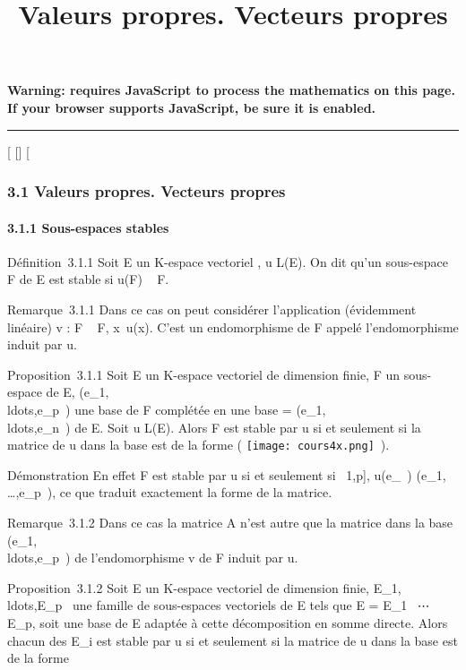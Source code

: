 \documentclass[]{article}
\title{Valeurs propres. Vecteurs propres}
\author{}
\date{}
\begin{document}
\maketitle

\textbf{Warning: 
requires JavaScript to process the mathematics on this page.\\ If your
browser supports JavaScript, be sure it is enabled.}

\begin{center}\rule{3in}{0.4pt}\end{center}

{[}
{[}{]}
{[}

\subsubsection{3.1 Valeurs propres. Vecteurs propres}

\paragraph{3.1.1 Sous-espaces stables}

Définition~3.1.1 Soit E un K-espace vectoriel , u \in L(E). On dit qu'un
sous-espace F de E est stable si u(F) \subset~ F.

Remarque~3.1.1 Dans ce cas on peut considérer l'application (évidemment
linéaire) v : F \rightarrow~ F, x\mapsto~u(x). C'est un
endomorphisme de F appelé l'endomorphisme induit par u.

Proposition~3.1.1 Soit E un K-espace vectoriel de dimension finie, F un
sous-espace de E,
(e\_1,\\ldots,e\_p~)
une base de F complétée en une base  =
(e\_1,\\ldots,e\_n~)
de E. Soit u \in L(E). Alors F est stable par u si et seulement si la
matrice de u dans la base  est de la forme \left (
\texttt{[image: cours4x.png]} \,\right ).

Démonstration En effet F est stable par u si et seulement si
\forall~\jmath \in {[}1,p{]}, u(e\_\jmath~)
\in\mathrmVect(e\_1,\\\ldots,e\_p~),
ce que traduit exactement la forme de la matrice.

Remarque~3.1.2 Dans ce cas la matrice A n'est autre que la matrice dans
la base
(e\_1,\\ldots,e\_p~)
de l'endomorphisme v de F induit par u.

Proposition~3.1.2 Soit E un K-espace vectoriel de dimension finie,
E\_1,\\ldots,E\_p~
une famille de sous-espaces vectoriels de E tels que E = E\_1
\oplus~⋯ \oplus~ E\_p, soit  une base de E
adaptée à cette décomposition en somme directe. Alors chacun des
E\_i est stable par u si et seulement si la matrice de u dans la
base  est de la forme
\end{document}
